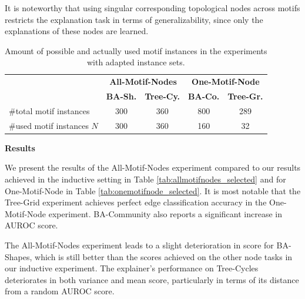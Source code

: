 It is noteworthy that using singular corresponding topological nodes across motifs restricts the explanation task in terms of generalizability, since only the explanations of these nodes are learned. %


\begin{table}[h]
    \centering
    \scriptsize
    \begin{tabular}{l|cc|cc}
    \textbf{} & \multicolumn{2}{c|}{\textbf{All-Motif-Nodes}} & \multicolumn{2}{c}{\textbf{One-Motif-Node}} \\
    \addlinespace
    \toprule
    \textbf{} & \textbf{BA-Sh.} & \textbf{Tree-Cy.} & \textbf{BA-Co.} & \textbf{Tree-Gr.} \\
    \midrule
    \#total motif instances & 300 & 360 & 800 & 289 \\
    \#used motif instances $N$ & 300 & 360 & 160  & 32 \\
    \end{tabular}
    \caption[Statistics of adapted motif node instances]{Amount of possible and actually used motif instances in the experiments with adapted instance sets.}
    \label{tab:motif-statistics-exp}
\end{table}

\textbf{Results}\par
We present the results of the All-Motif-Nodes experiment compared to our results achieved in the inductive setting in Table \ref{tab:allmotifnodes_selected} and for One-Motif-Node in Table \ref{tab:onemotifnode_selected}. It is most notable that the Tree-Grid experiment achieves perfect edge classification accuracy in the One-Motif-Node experiment. BA-Community also reports a significant increase in AUROC score.

The All-Motif-Nodes experiment leads to a slight deterioration in score for BA-Shapes, which is still better than the scores achieved on the other node tasks in our inductive experiment. The explainer's performance on Tree-Cycles deteriorates in both variance and mean score, particularly in terms of its distance from a random AUROC score.

